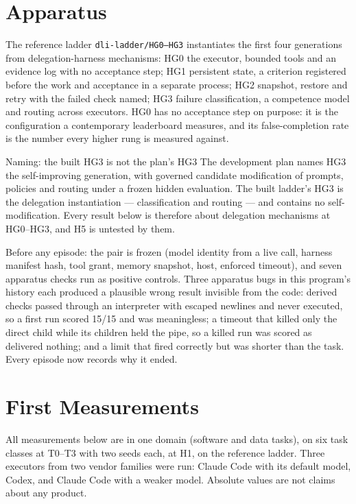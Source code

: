 \section{Apparatus}\label{sec:apparatus}

The reference ladder \texttt{dli-ladder/HG0--HG3} instantiates the first four generations from delegation-harness mechanisms: HG0 the executor, bounded tools and an evidence log with no acceptance step; HG1 persistent state, a criterion registered before the work and acceptance in a separate process; HG2 snapshot, restore and retry with the failed check named; HG3 failure classification, a competence model and routing across executors. HG0 has no acceptance step on purpose: it is the configuration a contemporary leaderboard measures, and its false-completion rate is the number every higher rung is measured against.

\begin{cautionbox}{Naming: the built HG3 is not the plan's HG3}
The development plan names HG3 the self-improving generation, with governed candidate modification of prompts, policies and routing under a frozen hidden evaluation. The built ladder's HG3 is the delegation instantiation --- classification and routing --- and contains no self-modification. Every result below is therefore about delegation mechanisms at HG0--HG3, and H5 is untested by them.
\end{cautionbox}

Before any episode: the pair is frozen (model identity from a live call, harness manifest hash, tool grant, memory snapshot, host, enforced timeout), and seven apparatus checks run as positive controls. Three apparatus bugs in this program's history each produced a plausible wrong result invisible from the code: derived checks passed through an interpreter with escaped newlines and never executed, so a first run scored 15/15 and was meaningless; a timeout that killed only the direct child while its children held the pipe, so a killed run was scored as delivered nothing; and a limit that fired correctly but was shorter than the task. Every episode now records why it ended.

\section{First Measurements}\label{sec:results}

All measurements below are in one domain (software and data tasks), on six task classes at T0--T3 with two seeds each, at H1, on the reference ladder. Three executors from two vendor families were run: Claude Code with its default model, Codex, and Claude Code with a weaker model. Absolute values are not claims about any product.

